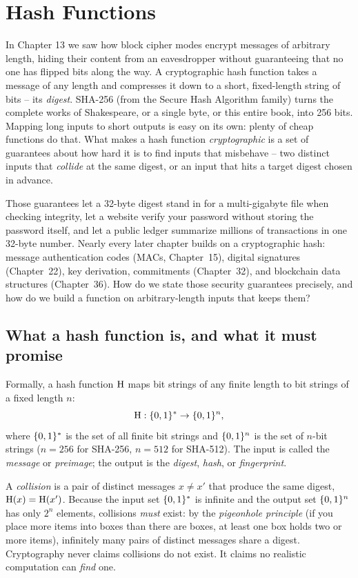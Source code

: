 \chapter{Hash Functions}

In Chapter 13 we saw how block cipher modes encrypt messages of arbitrary length, hiding their content from an eavesdropper without guaranteeing that no one has flipped bits along the way. A cryptographic hash function takes a message of any length and compresses it down to a short, fixed-length string of bits -- its \emph{digest}. SHA-256 (from the Secure Hash Algorithm family) turns the complete works of Shakespeare, or a single byte, or this entire book, into 256 bits. Mapping long inputs to short outputs is easy on its own: plenty of cheap functions do that. What makes a hash function \emph{cryptographic} is a set of guarantees about how hard it is to find inputs that misbehave -- two distinct inputs that \emph{collide} at the same digest, or an input that hits a target digest chosen in advance.

Those guarantees let a 32-byte digest stand in for a multi-gigabyte file when checking integrity, let a website verify your password without storing the password itself, and let a public ledger summarize millions of transactions in one 32-byte number. Nearly every later chapter builds on a cryptographic hash: message authentication codes (MACs, Chapter~15), digital signatures (Chapter~22), key derivation, commitments (Chapter~32), and blockchain data structures (Chapter~36). How do we state those security guarantees precisely, and how do we build a function on arbitrary-length inputs that keeps them?

\chapterline

\section{What a hash function is, and what it must promise}
\label{ch14:properties}

Formally, a hash function $\operatorname{H}$ maps bit strings of any finite length to bit strings of a fixed length $n$:
\[
  \operatorname{H} : \{0,1\}^{*} \to \{0,1\}^{n},
\]
where $\{0,1\}^{*}$ is the set of all finite bit strings and $\{0,1\}^{n}$ is the set of $n$-bit strings ($n = 256$ for SHA-256, $n = 512$ for SHA-512). The input is called the \emph{message} or \emph{preimage}; the output is the \emph{digest}, \emph{hash}, or \emph{fingerprint}.

A \emph{collision} is a pair of distinct messages $x \ne x'$ that produce the same digest, $\operatorname{H}(x) = \operatorname{H}(x')$. Because the input set $\{0,1\}^{*}$ is infinite and the output set $\{0,1\}^{n}$ has only $2^{n}$ elements, collisions \emph{must} exist: by the \emph{pigeonhole principle} (if you place more items into boxes than there are boxes, at least one box holds two or more items), infinitely many pairs of distinct messages share a digest. Cryptography never claims collisions do not exist. It claims no realistic computation can \emph{find} one.

